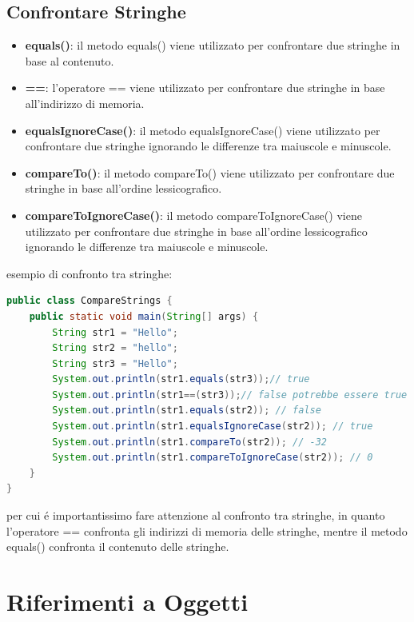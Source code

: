 \documentclass[11pt]{article}
\begin{document}
\subsection{Confrontare Stringhe}
\begin{itemize}
    \item \textbf{equals()}: il metodo equals() viene utilizzato per confrontare due stringhe in base al contenuto.
    \item \textbf{==}: l'operatore == viene utilizzato per confrontare due stringhe in base all'indirizzo di memoria.
    \item \textbf{equalsIgnoreCase()}: il metodo equalsIgnoreCase() viene utilizzato per confrontare due stringhe ignorando le differenze tra maiuscole e minuscole.
    \item \textbf{compareTo()}: il metodo compareTo() viene utilizzato per confrontare due stringhe in base all'ordine lessicografico.
    \item \textbf{compareToIgnoreCase()}: il metodo compareToIgnoreCase() viene utilizzato per confrontare due stringhe in base all'ordine lessicografico ignorando le differenze tra maiuscole e minuscole.
\end{itemize}
esempio di confronto tra stringhe:
\begin{lstlisting}[language=Java]
public class CompareStrings {
    public static void main(String[] args) {
        String str1 = "Hello";
        String str2 = "hello";
        String str3 = "Hello";
        System.out.println(str1.equals(str3));// true
        System.out.println(str1==(str3));// false potrebbe essere true se le stringhe sono nello stesso pool di stringhe, ovvero se sono state create con lo stesso operatore di creazione potrebbero avere lo stesso indirizzo di memoria.
        System.out.println(str1.equals(str2)); // false
        System.out.println(str1.equalsIgnoreCase(str2)); // true
        System.out.println(str1.compareTo(str2)); // -32
        System.out.println(str1.compareToIgnoreCase(str2)); // 0
    }
}
\end{lstlisting}
per cui é importantissimo fare attenzione al confronto tra stringhe, in quanto l'operatore == confronta gli indirizzi di memoria delle stringhe, mentre il metodo equals() confronta il contenuto delle stringhe.
\section{Riferimenti a Oggetti}
\end{document}
